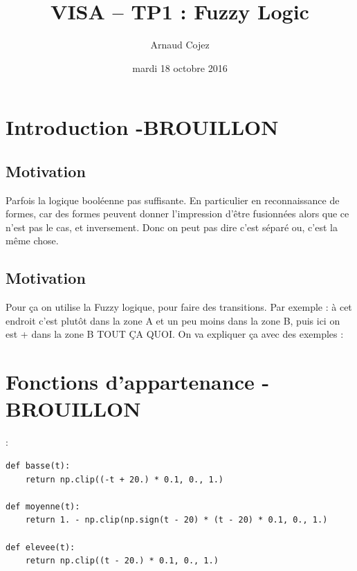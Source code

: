 \documentclass[a4paper]{article}
\begin{document}
\title{VISA -- TP1 : Fuzzy Logic}
\author{Arnaud Cojez}
\date{mardi 18 octobre 2016}

\maketitle

\newpage
\tableofcontents
\newpage

\section{Introduction -BROUILLON}

\subsection{Motivation}
Parfois la logique booléenne pas suffisante. En particulier en reconnaissance de formes, car des formes peuvent donner l'impression d'être fusionnées alors que ce n'est pas le cas, et inversement. Donc on peut pas dire c'est séparé ou, c'est la même chose.

\subsection{Motivation}
Pour ça on utilise la Fuzzy logique, pour faire des transitions. Par exemple : à cet endroit c'est plutôt dans la zone A et un peu moins dans la zone B, puis ici on est + dans la zone B TOUT ÇA QUOI.
On va expliquer ça avec des exemples :

\clearpage

\section{Fonctions d'appartenance -BROUILLON}:

\begin{lstlisting}
def basse(t):
    return np.clip((-t + 20.) * 0.1, 0., 1.)

def moyenne(t):
    return 1. - np.clip(np.sign(t - 20) * (t - 20) * 0.1, 0., 1.)

def elevee(t):
    return np.clip((t - 20.) * 0.1, 0., 1.)
\end{lstlisting}
\end{document}
